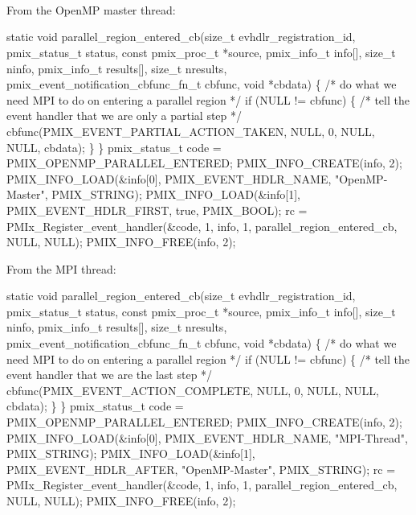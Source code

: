 {\large {}}

 \\
 \\
 \\

\example

From the OpenMP master thread:

\cspecificstart
\begin{codepar}
static void
parallel_region_entered_cb(size_t evhdlr_registration_id,
                           pmix_status_t status,
                           const pmix_proc_t *source,
                           pmix_info_t info[], size_t ninfo,
                           pmix_info_t results[], size_t nresults,
                           pmix_event_notification_cbfunc_fn_t cbfunc,
                           void *cbdata)
\{
    /* do what we need MPI to do on entering a parallel region */
    if (NULL != cbfunc) \{
        /* tell the event handler that we are only a partial step */
        cbfunc(PMIX_EVENT_PARTIAL_ACTION_TAKEN, NULL, 0, NULL, NULL,
               cbdata);
    \}
\}
pmix_status_t code = PMIX_OPENMP_PARALLEL_ENTERED;
PMIX_INFO_CREATE(info, 2);
PMIX_INFO_LOAD(&info[0], PMIX_EVENT_HDLR_NAME,
               "OpenMP-Master", PMIX_STRING);
PMIX_INFO_LOAD(&info[1], PMIX_EVENT_HDLR_FIRST,
               true, PMIX_BOOL);
rc = PMIx_Register_event_handler(&code, 1, info, 1,
                                 parallel_region_entered_cb,
                                 NULL, NULL);
PMIX_INFO_FREE(info, 2);
\end{codepar}
\cspecificend


From the MPI thread:

\cspecificstart
\begin{codepar}
static void
parallel_region_entered_cb(size_t evhdlr_registration_id,
                           pmix_status_t status,
                           const pmix_proc_t *source,
                           pmix_info_t info[], size_t ninfo,
                           pmix_info_t results[], size_t nresults,
                           pmix_event_notification_cbfunc_fn_t cbfunc,
                           void *cbdata)
\{
    /* do what we need MPI to do on entering a parallel region */
    if (NULL != cbfunc) \{
        /* tell the event handler that we are the last step */
        cbfunc(PMIX_EVENT_ACTION_COMPLETE, NULL, 0, NULL, NULL,
               cbdata);
    \}
\}
pmix_status_t code = PMIX_OPENMP_PARALLEL_ENTERED;
PMIX_INFO_CREATE(info, 2);
PMIX_INFO_LOAD(&info[0], PMIX_EVENT_HDLR_NAME,
               "MPI-Thread", PMIX_STRING);
PMIX_INFO_LOAD(&info[1], PMIX_EVENT_HDLR_AFTER,
               "OpenMP-Master", PMIX_STRING);
rc = PMIx_Register_event_handler(&code, 1, info, 1,
                                 parallel_region_entered_cb,
                                 NULL, NULL);
PMIX_INFO_FREE(info, 2);
\end{codepar}
\cspecificend

